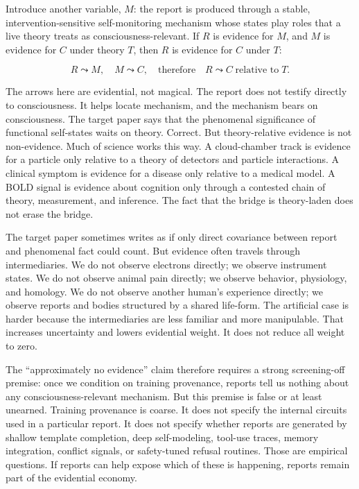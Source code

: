 \documentclass[11pt]{article}
\begin{document}
Introduce another variable, $M$: the report is produced through a stable, intervention-sensitive self-monitoring mechanism whose states play roles that a live theory treats as consciousness-relevant. If $R$ is evidence for $M$, and $M$ is evidence for $C$ under theory $T$, then $R$ is evidence for $C$ under $T$:

\[
R \leadsto M, \quad M \leadsto C, \quad \text{therefore} \quad R \leadsto C \; \text{relative to} \; T.
\]

The arrows here are evidential, not magical. The report does not testify directly to consciousness. It helps locate mechanism, and the mechanism bears on consciousness. The target paper says that the phenomenal significance of functional self-states waits on theory. Correct. But theory-relative evidence is not non-evidence. Much of science works this way. A cloud-chamber track is evidence for a particle only relative to a theory of detectors and particle interactions. A clinical symptom is evidence for a disease only relative to a medical model. A BOLD signal is evidence about cognition only through a contested chain of theory, measurement, and inference. The fact that the bridge is theory-laden does not erase the bridge.

The target paper sometimes writes as if only direct covariance between report and phenomenal fact could count. But evidence often travels through intermediaries. We do not observe electrons directly; we observe instrument states. We do not observe animal pain directly; we observe behavior, physiology, and homology. We do not observe another human's experience directly; we observe reports and bodies structured by a shared life-form. The artificial case is harder because the intermediaries are less familiar and more manipulable. That increases uncertainty and lowers evidential weight. It does not reduce all weight to zero.

The ``approximately no evidence'' claim therefore requires a strong screening-off premise: once we condition on training provenance, reports tell us nothing about any consciousness-relevant mechanism. But this premise is false or at least unearned. Training provenance is coarse. It does not specify the internal circuits used in a particular report. It does not specify whether reports are generated by shallow template completion, deep self-modeling, tool-use traces, memory integration, conflict signals, or safety-tuned refusal routines. Those are empirical questions. If reports can help expose which of these is happening, reports remain part of the evidential economy.
\end{document}
